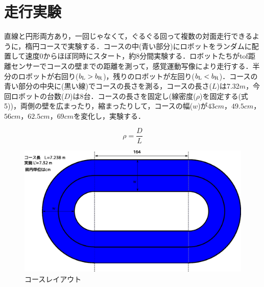 \documentclass[twocolumn]{jarticle} %
\begin{document}
\section{走行実験}
直線と円形両方あり，一回じゃなくて，ぐるぐる回って複数の対面走行できるように，楕円コースで実験する．コースの中(青い部分)にロボットをランダムに配置して速度0からほぼ同時にスタート，約8分間実験する．ロボットたちがtof距離センサーでコースの壁までの距離を測って，感覚運動写像により走行する．半分のロボットが右回り($b_{\rm L}>b_{\rm R}$)，残りのロボットが左回り($b_{\rm L}<b_{\rm R}$)．コースの青い部分の中央に(黒い線)でコースの長さを測る，コースの長さ($L$)は7.32$m$，今回ロボットの台数($D$)は8台．コースの長さを固定し(線密度($\rho$)を固定する(式5))，両側の壁を広まったり，縮まったりして，コースの幅($w$)が$43cm$，$49.5cm$，$56cm$，$62.5cm$，$69cm$を変化し，実験する．

\begin{equation}
\rho = \frac{D}{L}
\end{equation}

\begin{figure}[!ht]
    \centering
    \includegraphics[width=0.7\linewidth]{Oval_h2.eps}
    \caption{コースレイアウト}
\end{figure}
\end{document}
